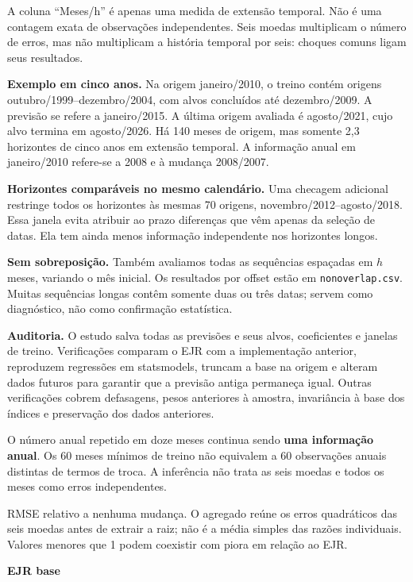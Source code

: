 \documentclass[10pt,a4paper]{article}
\newcommand{\pagina}[1]{\clearpage{\Large\bfseries\color{navy} #1}\par\vspace{6pt}}
\begin{document}
A coluna ``Meses/h'' é apenas uma medida de extensão temporal. Não é uma contagem exata de observações independentes. Seis moedas multiplicam o número de erros, mas não multiplicam a história temporal por seis: choques comuns ligam seus resultados.

\textbf{Exemplo em cinco anos.} Na origem janeiro/2010, o treino contém origens outubro/1999--dezembro/2004, com alvos concluídos até dezembro/2009. A previsão se refere a janeiro/2015. A última origem avaliada é agosto/2021, cujo alvo termina em agosto/2026. Há 140 meses de origem, mas somente 2,3 horizontes de cinco anos em extensão temporal. A informação anual em janeiro/2010 refere-se a 2008 e à mudança 2008/2007.

\textbf{Horizontes comparáveis no mesmo calendário.} Uma checagem adicional restringe todos os horizontes às mesmas 70 origens, novembro/2012--agosto/2018. Essa janela evita atribuir ao prazo diferenças que vêm apenas da seleção de datas. Ela tem ainda menos informação independente nos horizontes longos.

\textbf{Sem sobreposição.} Também avaliamos todas as sequências espaçadas em $h$ meses, variando o mês inicial. Os resultados por offset estão em \texttt{nonoverlap.csv}. Muitas sequências longas contêm somente duas ou três datas; servem como diagnóstico, não como confirmação estatística.

\textbf{Auditoria.} O estudo salva todas as previsões e seus alvos, coeficientes e janelas de treino. Verificações comparam o EJR com a implementação anterior, reproduzem regressões em statsmodels, truncam a base na origem e alteram dados futuros para garantir que a previsão antiga permaneça igual. Outras verificações cobrem defasagens, pesos anteriores à amostra, invariância à base dos índices e preservação dos dados anteriores.

O número anual repetido em doze meses continua sendo \textbf{uma informação anual}. Os 60 meses mínimos de treino não equivalem a 60 observações anuais distintas de termos de troca. A inferência não trata as seis moedas e todos os meses como erros independentes.

\pagina{4. Todas as moedas e todos os horizontes}
RMSE relativo a nenhuma mudança. O agregado reúne os erros quadráticos das seis moedas antes de extrair a raiz; não é a média simples das razões individuais. Valores menores que 1 podem coexistir com piora em relação ao EJR.

\textbf{EJR base}
\end{document}
